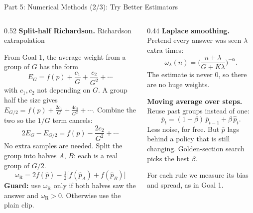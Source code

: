 \documentclass[aspectratio=169,10pt]{beamer}
\begin{document}
\begin{frame}{Part 5: Numerical Methods (2/3): Try Better Estimators}

\begin{columns}[T,onlytextwidth]
\begin{column}{0.52\textwidth}
\footnotesize
\textbf{Split-half Richardson.} \hfill \alert{Richardson extrapolation}

\smallskip
From Goal 1, the average weight from a group of $G$ has the form
\[
  E_G=f(p)+\frac{c_1}{G}+\frac{c_2}{G^2}+\cdots
\]
with $c_1,c_2$ not depending on $G$. A group half the size gives
$E_{G/2}=f(p)+\frac{2c_1}{G}+\frac{4c_2}{G^2}+\cdots$. Combine the two so the
$1/G$ term cancels:
\[
  2E_G-E_{G/2}=f(p)-\frac{2c_2}{G^2}+\cdots
\]
No extra samples are needed. Split the group into halves $A$, $B$: each is a real
group of $G/2$.
\[
  \omega_{\text{R}}=2f(\hat p)-\tfrac12\big[f(\hat p_A)+f(\hat p_B)\big]
\]
\textbf{Guard:} use $\omega_{\text{R}}$ only if both halves saw the answer and
$\omega_{\text{R}}>0$. Otherwise use the plain clip.
\end{column}

\begin{column}{0.44\textwidth}
\footnotesize
\textbf{Laplace smoothing.} Pretend every answer was seen $\lambda$ extra times:
\[
  \omega_\lambda(n)=\Big(\frac{n+\lambda}{G+K\lambda}\Big)^{-\alpha}.
\]
The estimate is never $0$, so there are no huge weights.

\medskip
\textbf{Moving average over steps.} Reuse past groups instead of one:
\[
  \bar p_t=(1-\beta)\,\bar p_{t-1}+\beta\,\hat p_t .
\]
Less noise, for free. But $\bar p$ lags behind a policy that is still changing.
\alert{Golden-section search} picks the best $\beta$.

\medskip
For each rule we measure its bias and spread, as in Goal 1.
\end{column}
\end{columns}
\end{frame}
\end{document}
